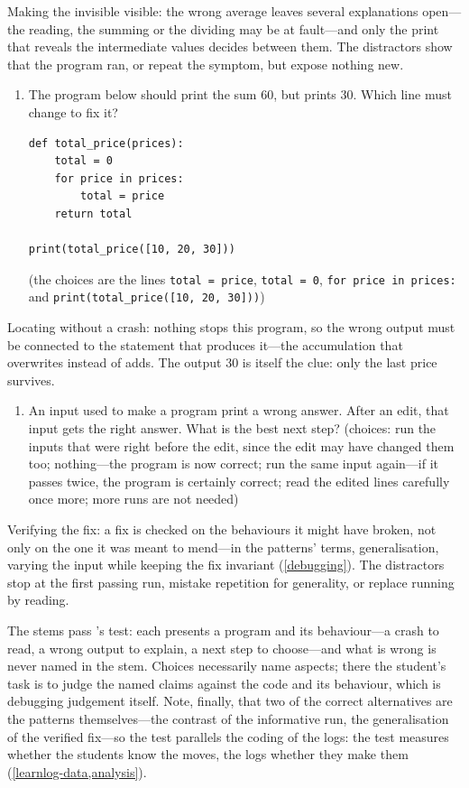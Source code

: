 Making the invisible visible: the wrong average leaves several
explanations open---the reading, the summing or the dividing may be at
fault---and only the print that reveals the intermediate values
decides between them.
The distractors show that the program ran, or repeat the symptom, but
expose nothing new.
\begin{enumerate}[resume*=knowledgequiz]
  \item The program below should print the sum 60, but prints 30.
    Which line must change to fix it?
\begin{verbatim}
def total_price(prices):
    total = 0
    for price in prices:
        total = price
    return total

print(total_price([10, 20, 30]))
\end{verbatim}
    (the choices are the lines \texttt{total = price},
    \texttt{total = 0},
    \texttt{for price in prices:} and
    \texttt{print(total_price([10, 20, 30]))})
\end{enumerate}
Locating without a crash: nothing stops this program, so the wrong
output must be connected to the statement that produces it---the
accumulation that overwrites instead of adds.
The output 30 is itself the clue: only the last price survives.
\begin{enumerate}[resume*=knowledgequiz]
  \item An input used to make a program print a wrong answer.
    After an edit, that input gets the right answer.
    What is the best next step?
    (choices: run the inputs that were right before the edit, since the
    edit may have changed them too; nothing---the program is now
    correct; run the same input again---if it passes twice, the program
    is certainly correct; read the edited lines carefully once more;
    more runs are not needed)
\end{enumerate}
Verifying the fix: a fix is checked on the behaviours it might have
broken, not only on the one it was meant to mend---in the patterns'
terms, generalisation, varying the input while keeping the fix
invariant (\cref{debugging}).
The distractors stop at the first passing run, mistake repetition for
generality, or replace running by reading.

The stems pass \citeauthor{NCOL}'s test: each presents a program and
its behaviour---a crash to read, a wrong output to explain, a next step
to choose---and what is wrong is never named in the stem.
Choices necessarily name aspects; there the student's task is to judge
the named claims against the code and its behaviour, which is debugging
judgement itself.
Note, finally, that two of the correct alternatives are the patterns
themselves---the contrast of the informative run, the generalisation of
the verified fix---so the test parallels the coding of the logs: the
test measures whether the students know the moves, the logs whether
they make them (\cref{learnlog-data,analysis}).

